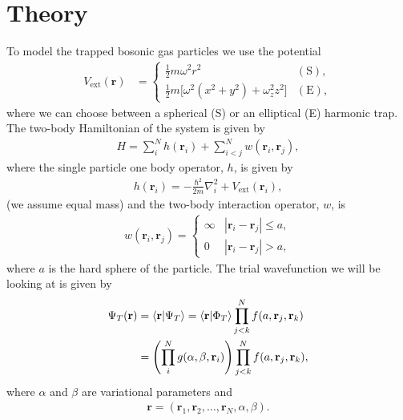 \documentclass[
    a4paper, aps, twocolumn, floatfix, superscriptaddress]{revtex4-1}
\newcommand{\vf}{\mathbf}
\newcommand{\1}{\mathds{1}}
\newcommand{\half}{\frac{1}{2}}
\begin{document}
\section{Theory}
    To model the trapped bosonic gas particles we use the potential
    \begin{align}
        V_{\text{ext}}(\vf{r})
        &=
        \begin{cases}
            \half m\omega^2r^2 & (\text{S}), \\
            \half m \bigl[
                \omega^2(x^2 + y^2) + \omega_z^2z^2
            \bigr] & (\text{E}),
        \end{cases}
    \end{align}
    where we can choose between a spherical (S) or an elliptical (E) harmonic
    trap. The two-body Hamiltonian of the system is given by
    \begin{align}
        H = \sum_{i}^{N}h(\vf{r}_i) + \sum_{i < j}^{N}w(\vf{r}_i, \vf{r}_j),
    \end{align}
    where the single particle one body operator, $h$, is given by
    \begin{align}
        h(\vf{r}_i) = -\frac{\hbar^2}{2m}\nabla_i^2
        + V_{\text{ext}}(\vf{r}_i),
    \end{align}
    (we assume equal mass)
    and the two-body interaction operator, $w$, is
    \begin{align}
        w(\vf{r}_i, \vf{r}_j)
        = \begin{cases}
            \infty & |\vf{r}_i - \vf{r}_j| \leq a, \\
            0 & |\vf{r}_i - \vf{r}_j| > a,
        \end{cases}
    \end{align}
    where $a$ is the hard sphere of the particle. The trial wavefunction we will
    be looking at is given by
    \begin{align}
        \Psi_T(\vf{r})
        &= \bra{\vf{r}}\ket{\Psi_T}
        = \bra{\vf{r}}\ket{\Phi_T}
        \prod_{j < k}^N f(a, \vf{r}_j, \vf{r}_k) \\
        &= \Biggl(
            \prod_i^N g(\alpha, \beta, \vf{r}_i)
        \Biggr)
        \prod_{j < k}^N f(a, \vf{r}_j, \vf{r}_k),
        \label{eq:initial_trial_wavefunction}
    \end{align}
    where $\alpha$ and $\beta$ are variational parameters and
    \begin{align}
        \vf{r} = (\vf{r}_1, \vf{r}_2, \dots, \vf{r}_N, \alpha, \beta).
    \end{align}
\end{document}
